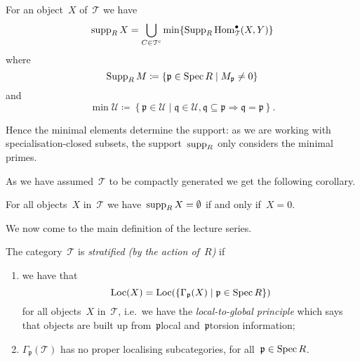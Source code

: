 \documentclass[10pt,a4paper]{article}
\begin{document}
\begin{theorem}
  For an object~$X$ of~$\mathcal{T}$ we have
  \begin{equation}
    \operatorname{supp}_R X=\bigcup_{C\in\mathcal{T}^{\mathrm{c}}}\min\{\operatorname{Supp}_R\operatorname{Hom}_{\mathcal{T}}^\bullet(X,Y)\}
  \end{equation}
  where
  \begin{equation}
    \operatorname{Supp}_R M\coloneqq\left\{ \mathfrak{p}\in\operatorname{Spec} R\mid M_{\mathfrak{p}}\neq 0 \right\}
  \end{equation}
  and
  \begin{equation}
    \min\mathcal{U}\coloneqq\left\{ \mathfrak{p}\in\mathcal{U}\mid\mathfrak{q}\in\mathcal{U},\mathfrak{q}\subseteq\mathfrak{p}\Rightarrow\mathfrak{q}=\mathfrak{p} \right\}.
  \end{equation}
\end{theorem}
Hence the minimal elements determine the support: as we are working with specialisation-closed subsets, the support~$\operatorname{supp}_R$ only considers the minimal primes.

As we have assumed~$\mathcal{T}$ to be compactly generated we get the following corollary.
\begin{corollary}
  For all objects~$X$ in~$\mathcal{T}$ we have~$\operatorname{supp}_R X=\emptyset$ if and only if~$X=0$.
\end{corollary}

We now come to the main definition of the lecture series.
\begin{definition}
  The category~$\mathcal{T}$ is \emph{stratified (by the action of~$R$)} if
  \begin{enumerate}
    \item we have that
      \begin{equation}
        \operatorname{Loc}(X)=\operatorname{Loc}(\{\Gamma_{\mathfrak{p}}(X)\mid\mathfrak{p}\in\operatorname{Spec} R\})
      \end{equation}
      for all objects~$X$ in~$\mathcal{T}$, i.e.\ we have the \emph{local-to-global principle} which says that objects are built up from~$\mathfrak{p}$\dash local and~$\mathfrak{p}$\dash torsion information;
    \item $\Gamma_{\mathfrak{p}}(\mathcal{T})$ has no proper localising subcategories, for all~$\mathfrak{p}\in\operatorname{Spec} R$.
  \end{enumerate}
\end{definition}
\end{document}
